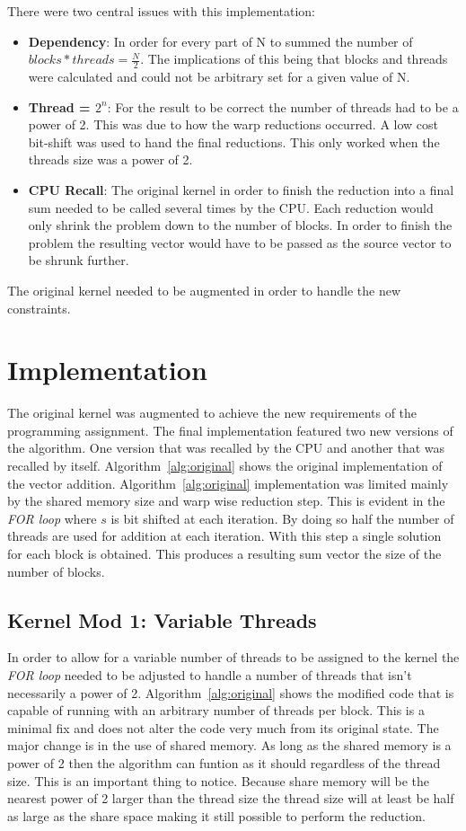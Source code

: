 \documentclass[conference]{IEEEtran}
\begin{document}
There were two central issues with this implementation:
\begin{itemize}
  \item \textbf{Dependency}: In order for every part of N to summed the number of $blocks*threads=\frac{N}{2}$. The implications of this being that blocks and threads were calculated and could not be arbitrary set for a given value of N.
  \item \textbf{Thread = $2^n$}: For the result to be correct the number of threads had to be a power of 2. This was due to how the warp reductions occurred. A low cost bit-shift was used to hand the final reductions. This only worked when the threads size was a power of 2.
  \item \textbf{CPU Recall}: The original kernel in order to finish the reduction into a final sum needed to be called several times by the CPU. Each reduction would only shrink the problem down to the number of blocks. In order to finish the problem the resulting vector would have to be passed as the source vector to be shrunk further.
\end{itemize}

The original kernel needed to be augmented in order to handle the new constraints.
\section{Implementation}
The original kernel was augmented to achieve the new requirements of the programming assignment. The final implementation featured two new versions of the algorithm. One version that was recalled by the CPU and another that was recalled by itself. Algorithm~\ref{alg:original} shows the original implementation of the vector addition. Algorithm~\ref{alg:original} implementation was limited mainly by the shared memory size and warp wise reduction step. This is evident in the \emph{FOR loop} where $s$ is bit shifted at each iteration. By doing so half the number of threads are used for addition at each iteration. With this step a single solution for each block is obtained. This produces a resulting sum vector the size of the number of blocks.

\subsection{Kernel Mod 1: Variable Threads}
In order to allow for a variable number of threads to be assigned to the kernel the \emph{FOR loop} needed to be adjusted to handle a number of threads that isn't necessarily a power of 2. Algorithm~\ref{alg:original} shows the modified code that is capable of running with an arbitrary number of threads per block. This is a minimal fix and does not alter the code very much from its original state. The major change is in the use of shared memory. As long as the shared memory is a power of 2 then the algorithm can funtion as it should regardless of the thread size. This is an important thing to notice. Because share memory will be the nearest power of 2 larger than the thread size the thread size will at least be half as large as the share space making it still possible to perform the reduction.
\end{document}
